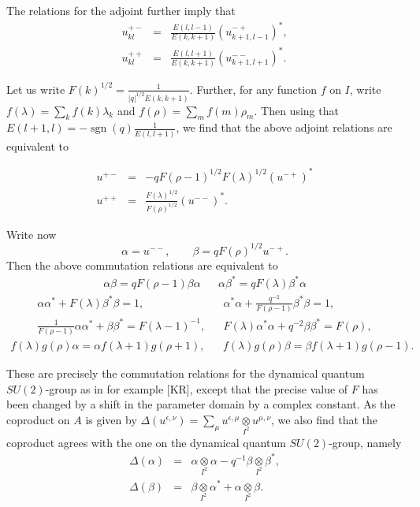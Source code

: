 \documentclass[12pt]{article}
\theoremstyle{change}
\DeclareMathOperator{\sgn}{\mathrm{sgn}}
\newcommand{\itimes}{\underset{I^2}{\otimes}}
\theoremstyle{definition}
\numberwithin{equation}{section}
\begin{document}
The relations for the adjoint further imply that \begin{eqnarray*}u_{kl}^{+-} &=&\frac{E(l,l-1)}{E(k,k+1)}(u_{k+1,l-1}^{-+})^*,\\  u_{kl}^{++}&=& \frac{E(l,l+1)}{E(k,k+1)}(u_{k+1,l+1}^{--})^* .\end{eqnarray*}

Let us write $F(k)^{1/2} = \frac{1}{|q|^{1/2}E(k,k+1)}$. Further, for any function $f$ on $I$, write $f(\lambda) = \sum_k f(k)\lambda_k$ and $f(\rho) = \sum_m f(m)\rho_m$. Then using that $E(l+1,l) = -\sgn(q)\frac{1}{E(l,l+1)}$, we find that the above adjoint relations are equivalent to

\begin{eqnarray*} u^{+-} &=& -q F(\rho-1)^{1/2}F(\lambda)^{1/2}(u^{-+})^* \\ u^{++} &=&  \frac{F(\lambda)^{1/2}}{F(\rho)^{1/2}}(u^{--})^*.
\end{eqnarray*}

Write now \[\alpha = u^{--},\qquad \beta = qF(\rho)^{1/2}u^{-+}.\] Then the above commutation relations are equivalent to \begin{align*} \alpha \beta = qF(\rho-1)\beta\alpha && \alpha\beta^* = qF(\lambda)\beta^*\alpha\end{align*} \begin{align*} \alpha\alpha^* +F(\lambda)\beta^*\beta = 1,&& \alpha^*\alpha+\frac{q^{-2}}{F(\rho-1)}\beta^*\beta = 1,\\ \frac{1}{F(\rho-1)}\alpha\alpha^* +\beta\beta^* = F(\lambda-1)^{-1},&& F(\lambda)\alpha^*\alpha +q^{-2}\beta\beta^* = F(\rho),\end{align*} \begin{align*} f(\lambda)g(\rho)\alpha =
\alpha f(\lambda+1)g(\rho+1),&& f(\lambda)g(\rho)\beta = \beta f(\lambda+1)g(\rho-1).\end{align*}

These are precisely the commutation relations for the dynamical quantum $SU(2)$-group as in for example [KR], except that the precise value of $F$ has been changed by a shift in the parameter domain by a complex constant. As the coproduct on $A$ is given by $\Delta(u^{\epsilon,\nu}) = \sum_{\mu} u^{\epsilon,\mu}\itimes u^{\mu,\nu}$, we also find that the coproduct agrees with the one on the dynamical quantum $SU(2)$-group, namely \begin{eqnarray*} \Delta(\alpha) &=& \alpha\itimes \alpha - q^{-1}\beta\itimes \beta^*,\\ \Delta(\beta) &=& \beta\itimes \alpha^* +\alpha\itimes \beta.\end{eqnarray*}
\end{document}
